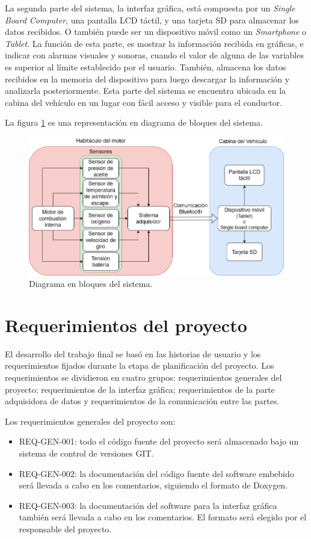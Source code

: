 La segunda parte del sistema, la interfaz gráfica, está compuesta por un \textit{Single Board Computer}, una pantalla LCD táctil, y una tarjeta SD para almacenar los datos recibidos. O también puede ser un dispositivo móvil como un \textit{Smartphone} o \textit{Tablet}. La función de esta parte, es mostrar la información recibida en gráficas, e indicar con alarmas visuales y sonoras, cuando el valor de alguna de las variables es superior al límite establecido por el usuario. También, almacena los datos recibidos en la memoria del dispositivo para luego descargar la información y analizarla posteriormente. Esta parte del sistema se encuentra ubicada en la cabina del vehículo en un lugar con fácil acceso y visible para el conductor.

La figura \ref{fig:diagrama-de-bloques} es una representación en diagrama de bloques del sistema.

\begin{figure}[htpb]
\centering
\includegraphics[width=.9\textwidth]{./Figures/diagrama-proyecto.png}
\caption{Diagrama en bloques del sistema.}
\label{fig:diagrama-de-bloques}
\end{figure}

\section{Requerimientos del proyecto}

El desarrollo del trabajo final se basó en las historias de usuario y los requerimientos fijados durante la etapa de planificación del proyecto. Los requerimientos se dividieron en cuatro grupos: requerimientos generales del proyecto; requerimientos de la interfaz gráfica; requerimientos de la parte adquisidora de datos y requerimientos de la comunicación entre las partes.

Los requerimientos generales del proyecto son:
\begin{itemize}
\item REQ-GEN-001: todo el código fuente del proyecto será almacenado bajo un sistema de control de versiones GIT.
\item REQ-GEN-002: la documentación del código fuente del software embebido será llevada a cabo en los comentarios, siguiendo el formato de Doxygen.
\item REQ-GEN-003: la documentación del software para la interfaz gráfica también será llevada a cabo en los comentarios. El formato será elegido por el responsable del proyecto.
\end{itemize}

